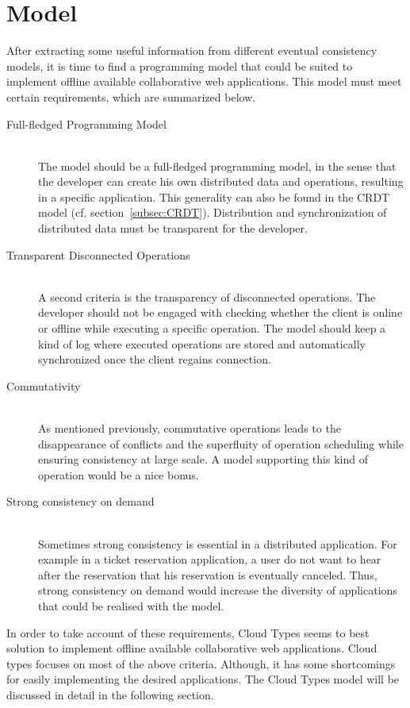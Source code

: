 \documentclass[a4paper,12pt]{report}
\begin{document}
\section{Model}\label{sec:Model}

After extracting some useful information from different eventual consistency models, it is time to find a programming model that could be suited to implement offline available collaborative web applications. This model must meet certain requirements, which are summarized below.

\begin{description}
    \item[Full-fledged Programming Model] \hfill \\The model should be a full-fledged programming model, in the sense that the developer can create his own distributed data and operations, resulting in a specific application. This generality can also be found in the CRDT model (cf. section~\ref{subsec:CRDT}). Distribution and synchronization of distributed data must be transparent for the developer.
    \item[Transparent Disconnected Operations] \hfill \\A second criteria is the transparency of disconnected operations. The developer should not be engaged with checking whether the client is online or offline while executing a specific operation. The model should keep a kind of log where executed operations are stored and automatically synchronized once the client regains connection. 
    \item[Commutativity] \hfill \\As mentioned previously, commutative operations leads to the disappearance of conflicts and the superfluity of operation scheduling while ensuring consistency at large scale. A model supporting this kind of operation would be a nice bonus.  
    \item[Strong consistency on demand] \hfill \\Sometimes strong consistency is essential in a distributed application. For example in a ticket reservation application, a user do not want to hear after the reservation that his reservation is eventually canceled. Thus, strong consistency on demand would increase the diversity of applications that could be realised with the model.
\end{description}

In order to take account of these requirements, Cloud Types seems to best solution to implement offline available collaborative web applications. Cloud types focuses on most of the above criteria. Although, it has some shortcomings for easily implementing the desired applications. The Cloud Types model will be discussed in detail in the following section.
\end{document}
